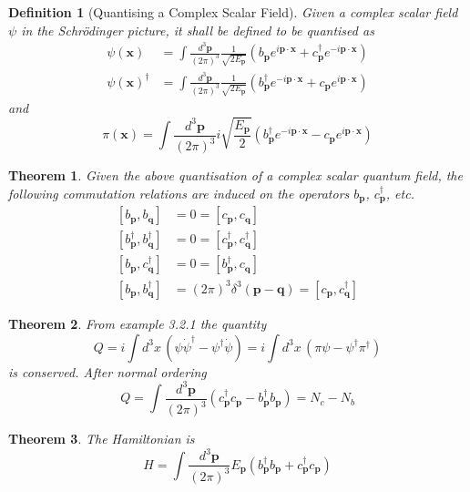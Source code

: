 \documentclass{article}
\newtheorem{theorem}{Theorem}[subsection]
\newtheorem{definition}{Definition}[subsection]
\newcommand{\tmeas}{\frac{d^3\bm{p}}{(2\pi)^3}}
\newcommand{\comm}[2][]{\left[ #1, #2 \right]} %
\begin{document}
\begin{definition}[Quantising a Complex Scalar Field]
Given a complex scalar field $\psi$ in the Schr\"odinger picture, it shall be defined to be quantised as
\begin{align*}
\psi(\bm{x}) &= \int\tmeas  \frac{1}{\sqrt{2E_{\bm{p}}}} \left( b_{\bm{p}} e^{i\bm{p}\cdot\bm{x}} + c_{\bm{p}}^\dagger e^{-i\bm{p}\cdot\bm{x}} \right) \\ 
\psi(\bm{x})^\dagger &= \int\tmeas  \frac{1}{\sqrt{2E_{\bm{p}}}} \left( b_{\bm{p}}^\dagger e^{-i\bm{p}\cdot\bm{x}} + c_{\bm{p}} e^{i\bm{p}\cdot\bm{x}} \right)
\end{align*}
and
\[
\pi(\bm{x})=\int\tmeas  i\sqrt{\frac{E_{\bm{p}}}{2}} \left( b_{\bm{p}}^\dagger e^{-i\bm{p}\cdot\bm{x}} - c_{\bm{p}} e^{i\bm{p}\cdot\bm{x}} \right)
\]
\end{definition}

\begin{theorem}
Given the above quantisation of a complex scalar quantum field, the following commutation relations are induced on the operators $b_{\bm{p}}$, $c_{\bm{p}}^\dagger$, etc. 
\begin{align*}
    \comm[b_{\bm{p}}]{b_{\bm{q}}} &= 0 = \comm[c_{\bm{p}}]{c_{\bm{q}}} \\
    \comm[b_{\bm{p}}^\dagger]{b_{\bm{q}}^\dagger} &= 0 = \comm[c_{\bm{p}}^\dagger]{c_{\bm{q}}^\dagger} \\
    \comm[b_{\bm{p}}]{c_{\bm{q}}^\dagger} &= 0 = \comm[b_{\bm{p}}^\dagger]{c_{\bm{q}}}\\
    \comm[b_{\bm{p}}]{b_{\bm{q}}^\dagger} &= (2\pi)^3 \delta^3(\bm{p}-\bm{q}) = \comm[c_{\bm{p}}]{c_{\bm{q}}^\dagger}
\end{align*}
\end{theorem}

\begin{theorem}
From example 3.2.1 the quantity
\[
Q=i \int d^3x \, \left( \psi\dot{\psi}^\dagger-\psi^\dagger\dot{\psi} \right) = i \int d^3x \, \left( \pi\psi - \psi^\dagger \pi^\dagger \right)
\]
is conserved. After normal ordering 
\[
Q=\int \tmeas \left( c_{\bm{p}}^\dagger c_{\bm{p}} - b_{\bm{p}}^\dagger b_{\bm{p}} \right) = N_c - N_b
\]
\end{theorem}

\begin{theorem}
The Hamiltonian is 
\[
H = \int\tmeas E_{\bm{p}} \left( b_{\bm{p}}^\dagger b_{\bm{p}} + c_{\bm{p}}^\dagger c_{\bm{p}} \right)
\]
\end{theorem}
\end{document}
